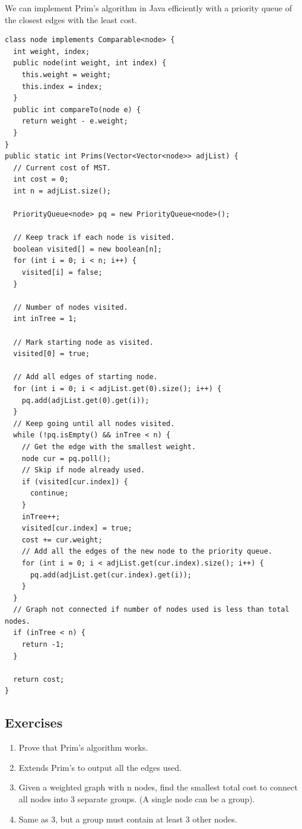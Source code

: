 \documentclass[11pt,oneside]{book}
\begin{document}
We can implement Prim's algorithm in Java efficiently with a priority queue of the closest edges with the least cost.

\begin{lstlisting}
class node implements Comparable<node> {
  int weight, index;
  public node(int weight, int index) {
    this.weight = weight;
    this.index = index;
  }
  public int compareTo(node e) {
    return weight - e.weight;
  }
}
public static int Prims(Vector<Vector<node>> adjList) {
  // Current cost of MST.
  int cost = 0;
  int n = adjList.size();
  
  PriorityQueue<node> pq = new PriorityQueue<node>();
  
  // Keep track if each node is visited.
  boolean visited[] = new boolean[n];
  for (int i = 0; i < n; i++) {
    visited[i] = false;
  }
  
  // Number of nodes visited.
  int inTree = 1;
  
  // Mark starting node as visited.
  visited[0] = true;
  
  // Add all edges of starting node.
  for (int i = 0; i < adjList.get(0).size(); i++) {
    pq.add(adjList.get(0).get(i));
  }
  // Keep going until all nodes visited.
  while (!pq.isEmpty() && inTree < n) {
    // Get the edge with the smallest weight.
    node cur = pq.poll();
    // Skip if node already used.
    if (visited[cur.index]) {
      continue;
    }
    inTree++;
    visited[cur.index] = true;
    cost += cur.weight;
    // Add all the edges of the new node to the priority queue.
    for (int i = 0; i < adjList.get(cur.index).size(); i++) {
      pq.add(adjList.get(cur.index).get(i));
    }
  }
  // Graph not connected if number of nodes used is less than total nodes.
  if (inTree < n) {
    return -1;
  }

  return cost;
}
\end{lstlisting}

\subsection{Exercises}

\begin{enumerate}
\item Prove that Prim's algorithm works.
\item Extends Prim's to output all the edges used.
\item Given a weighted graph with n nodes, find the smallest total cost to connect all nodes into 3 separate groups. (A single node can be a group).
\item Same as 3, but a group must contain at least 3 other nodes.
\end{enumerate}
\end{document}
